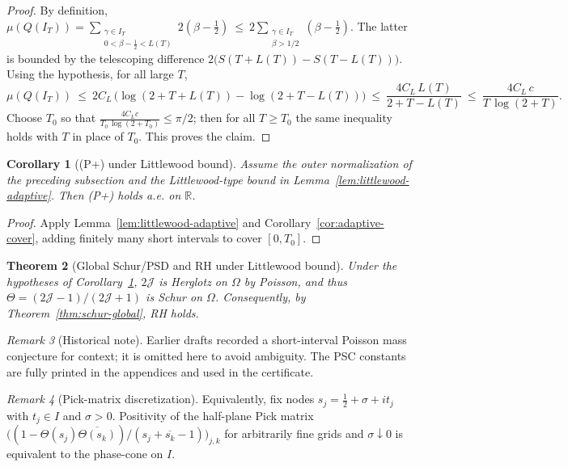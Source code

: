 \documentclass[11pt]{article}
\newtheorem{theorem}{Theorem}
\newtheorem{corollary}[theorem]{Corollary}
\theoremstyle{definition}
\theoremstyle{remark}
\newtheorem{remark}[theorem]{Remark}
\newcommand{\R}{\mathbb{R}}
\begin{document}
\begin{proof}
By definition, \(\mu(Q(I_T))=\sum_{\substack{\gamma\in I_T\\ 0<\beta-\tfrac12< L(T)}} 2(\beta-\tfrac12)\ \le\ 2\sum_{\substack{\gamma\in I_T\\ \beta>1/2}} (\beta-\tfrac12)\). The latter is bounded by the telescoping difference \(2\big(S(T+L(T)) - S(T-L(T))\big)\). Using the hypothesis, for all large \(T\),
\[
 \mu(Q(I_T))\ \le\ 2C_L\,\Big(\log(2+T+L(T)) - \log(2+T-L(T))\Big)
 \ \le\ \frac{4C_L\,L(T)}{2+T-L(T)}\ \le\ \frac{4C_L\,c}{T\,\log(2+T)}.
\]
Choose \(T_0\) so that \(\frac{4C_L c}{T_0\,\log(2+T_0)}\le \pi/2\); then for all \(T\ge T_0\) the same inequality holds with \(T\) in place of \(T_0\). This proves the claim.
\end{proof}
\begin{corollary}[(P+) under Littlewood bound]\label{cor:Pplus-Littlewood}
Assume the outer normalization of the preceding subsection and the Littlewood-type bound in Lemma~\ref{lem:littlewood-adaptive}. Then \emph{(P+)} holds a.e. on \(\R\).
\end{corollary}
\begin{proof}
Apply Lemma~\ref{lem:littlewood-adaptive} and Corollary~\ref{cor:adaptive-cover}, adding finitely many short intervals to cover \([0,T_0]\).
\end{proof}
\begin{theorem}[Global Schur/PSD and RH under Littlewood bound]\label{thm:global-RH-Littlewood}
Under the hypotheses of Corollary~\ref{cor:Pplus-Littlewood}, \(2\mathcal J\) is Herglotz on \(\Omega\) by Poisson, and thus \(\Theta=(2\mathcal J-1)/(2\mathcal J+1)\) is Schur on \(\Omega\). Consequently, by Theorem~\ref{thm:schur-global}, RH holds.
\end{theorem}
\begin{remark}[Historical note]
Earlier drafts recorded a short-interval Poisson mass conjecture for context; it is omitted here to avoid ambiguity. The PSC constants are fully printed in the appendices and used in the certificate.
\end{remark}
\begin{remark}[Pick-matrix discretization]\label{rem:pick-certificate}
Equivalently, fix nodes $s_j=\tfrac12+\sigma+i t_j$ with $t_j\in I$ and $\sigma>0$. Positivity of the half-plane Pick matrix \(\big((1-\Theta(s_j)\overline{\Theta(s_k)})/(s_j+\overline{s_k}-1)\big)_{j,k}\) for arbitrarily fine grids and $\sigma\downarrow 0$ is equivalent to the phase-cone on $I$. \end{remark}
\end{document}
